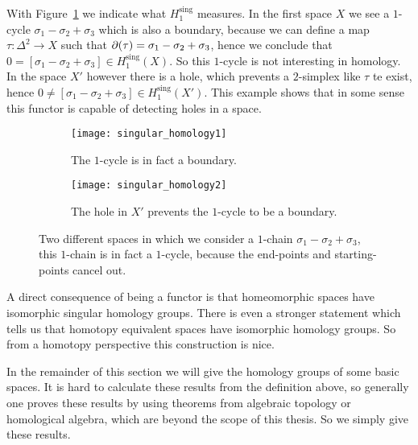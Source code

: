 With Figure~\ref{fig:singular_homology} we indicate what $H^\text{sing}_1$ measures. In the first space $X$ we see a $1$-cycle $\sigma_1-\sigma_2+\sigma_3$ which is also a boundary, because we can define a map $\tau: \Delta^2 \to X$ such that $\partial(\tau) = \sigma_1-\sigma_2+\sigma_3$, hence we conclude that $0 = [\sigma_1-\sigma_2+\sigma_3] \in H^\text{sing}_1(X)$. So this $1$-cycle is not interesting in homology. In the space $X'$ however there is a hole, which prevents a $2$-simplex like $\tau$ te exist, hence $0 \neq [\sigma_1-\sigma_2+\sigma_3] \in H^\text{sing}_1(X')$. This example shows that in some sense this functor is capable of detecting holes in a space.

\begin{figure}[h!]
\begin{subfigure}{.5\textwidth}
  \centering
  \texttt{[image: singular\_homology1]}
  \caption{The $1$-cycle is in fact a boundary.}
\end{subfigure}%
\begin{subfigure}{.5\textwidth}
  \centering
  \texttt{[image: singular\_homology2]}
  \caption{The hole in $X'$ prevents the $1$-cycle to be a boundary.}
\end{subfigure}
\caption{Two different spaces in which we consider a $1$-chain $\sigma_1-\sigma_2+\sigma_3$, this $1$-chain is in fact a $1$-cycle, because the end-points and starting-points cancel out.}
\label{fig:singular_homology}
\end{figure}

A direct consequence of being a functor is that homeomorphic spaces have isomorphic singular homology groups. There is even a stronger statement which tells us that homotopy equivalent spaces have isomorphic homology groups. So from a homotopy perspective this construction is nice.

In the remainder of this section we will give the homology groups of some basic spaces. It is hard to calculate these results from the definition above, so generally one proves these results by using theorems from algebraic topology or homological algebra, which are beyond the scope of this thesis. So we simply give these results.


